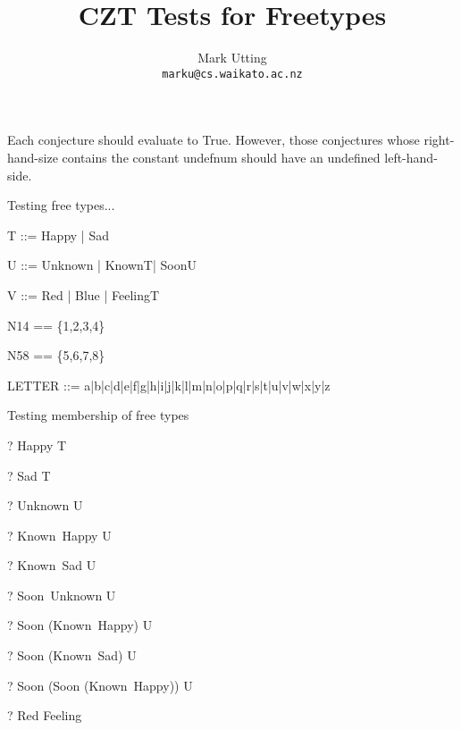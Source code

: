 \documentclass{article}
\title{CZT Tests for Freetypes}
\author{Mark Utting \\ \texttt{marku@cs.waikato.ac.nz}}
\begin{document}
\maketitle

Each conjecture should evaluate to True.
However, those conjectures whose right-hand-size contains
the constant undefnum should have an undefined left-hand-side.


Testing free types...

\begin{zed}
T ::= Happy | Sad
\end{zed}

\begin{zed}
U ::= Unknown | Known\ldata T\rdata | Soon\ldata U\rdata
\end{zed}

\begin{zed}
V ::= Red | Blue | Feeling\ldata T \rdata
\end{zed}

\begin{zed}
N14 == \{1,2,3,4\}
\end{zed}

\begin{zed}
N58 == \{5,6,7,8\}
\end{zed}

\begin{zed}
LETTER ::= a|b|c|d|e|f|g|h|i|j|k|l|m|n|o|p|q|r|s|t|u|v|w|x|y|z
\end{zed}

Testing membership of free types
\begin{zed} \vdash?  Happy \in T \end{zed}
\begin{zed} \vdash?  Sad \in T \end{zed}
\begin{zed} \vdash?  Unknown \in U \end{zed}
\begin{zed} \vdash?  Known~Happy \in U \end{zed}
\begin{zed} \vdash?  Known~Sad \in U \end{zed}
\begin{zed} \vdash?  Soon~Unknown \in U \end{zed}
\begin{zed} \vdash?  Soon (Known~Happy) \in U \end{zed}
\begin{zed} \vdash?  Soon (Known~Sad) \in U \end{zed}
\begin{zed} \vdash?  Soon (Soon (Known~Happy)) \in U \end{zed}
\begin{zed} \vdash?  Red \notin \ran Feeling \end{zed}
\end{document}
